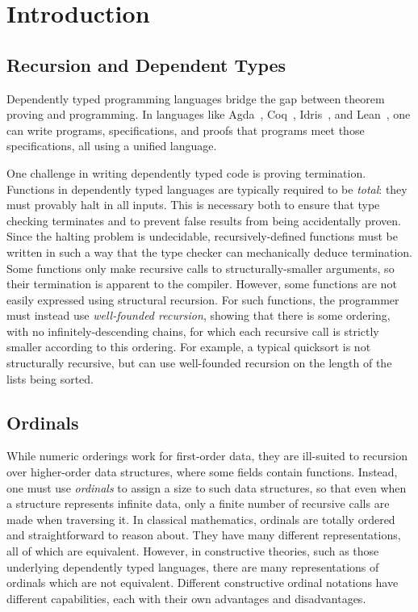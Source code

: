 \section{Introduction}
\label{sec:intro}

\subsection{Recursion and Dependent Types}
Dependently typed programming languages
 bridge the gap between theorem proving and programming.
In languages like Agda~\citep{agdaPaper}, Coq~\citep{coqart},
Idris~\citep{DBLP:journals/corr/abs-2104-00480}, and Lean~\citep{10.1007/978-3-319-21401-6_26},
 one can write programs, specifications, and proofs that programs
meet those specifications, all using a unified language.

One challenge in writing dependently typed code is proving termination.
Functions in dependently typed languages are typically required to be
\textit{total}: they must provably halt in all inputs.
This is necessary both to ensure that type checking terminates and to prevent
false results from being accidentally proven.
Since the halting problem
is undecidable, recursively-defined functions must be written in such a way that the type checker
can mechanically deduce termination.
Some functions only make recursive calls to structurally-smaller arguments,
so their termination is apparent to the compiler. However, some functions
are not easily expressed using structural recursion.
For such functions, the programmer must instead use \textit{well-founded recursion}, showing that there is some ordering, with no infinitely-descending
chains, for which each recursive call is strictly smaller according to this ordering. For example, a typical quicksort is not structurally recursive, but can use well-founded recursion on the length of the lists being sorted.

\subsection{Ordinals}

While numeric orderings work for first-order data, they are ill-suited to recursion over
higher-order data structures, where some fields contain functions.
Instead, one must use \textit{ordinals} to assign a size to such data structures, so that even
when a structure represents infinite data, only a finite number of recursive calls are made when traversing it.
In classical mathematics, ordinals are totally ordered and straightforward to reason about. They have
many different representations, all of which are equivalent.
However, in constructive theories, such as those underlying dependently typed languages,
there are many representations of ordinals which are not equivalent.
Different constructive ordinal notations have different capabilities, each with their own advantages and disadvantages.

